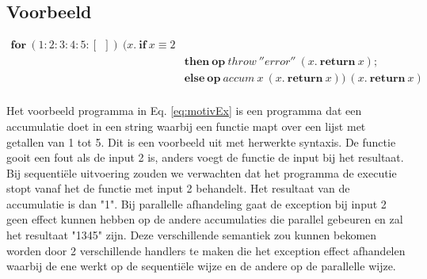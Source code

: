 \subsection{Voorbeeld} 
\begin{equation} \label{eq:motivEx}
    \begin{split}
        \textbf{for}\:(1:2:3:4:5:[\:\:])\:(x.\:\textbf{if}\:x \equiv 2 & \\
        & \textbf{then}\:\textbf{op}\:throw\:''error''\:(x.\:\textbf{return}\:x);\\
        & \textbf{else}\:\textbf{op}\:accum\:x\:(x.\:\textbf{return}\:x))\:(x.\:\textbf{return}\:x) \\
    \end{split}
\end{equation}

Het voorbeeld programma in Eq. \ref{eq:motivEx} is een programma dat een accumulatie doet in een string waarbij een functie mapt over een lijst met getallen van 1 tot 5. Dit is een voorbeeld uit \cite{Xie2021} met herwerkte syntaxis. De functie gooit een fout als de input 2 is, anders voegt de functie de input bij het resultaat. Bij sequentiële uitvoering zouden we verwachten dat het programma de executie stopt vanaf het de functie met input 2 behandelt. Het resultaat van de accumulatie is dan "1". Bij parallelle afhandeling gaat de exception bij input 2 geen effect kunnen hebben op de andere accumulaties die parallel gebeuren en zal het resultaat "1345" zijn. Deze verschillende semantiek zou kunnen bekomen worden door 2 verschillende handlers te maken die het exception effect afhandelen waarbij de ene werkt op de sequentiële wijze en de andere op de parallelle wijze.




